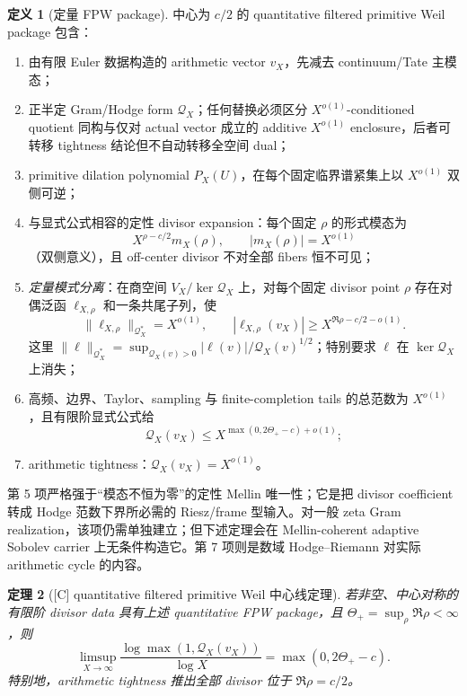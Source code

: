 \documentclass[UTF8,11pt,a4paper]{ctexart}
\newtheorem{theorem}{定理}[section]
\theoremstyle{definition}
\newtheorem{definition}[theorem]{定义}
\theoremstyle{remark}
\newcommand{\1}{\mathbf 1}
\newcommand{\cQ}{\mathcal Q}
\newcommand{\statusC}{\textnormal{[C]}}
\begin{document}
\begin{definition}[定量 FPW package]
中心为 $c/2$ 的 quantitative filtered primitive Weil package 包含：
\begin{enumerate}
  \item 由有限 Euler 数据构造的 arithmetic vector $v_X$，先减去 continuum/Tate 主模态；
  \item 正半定 Gram/Hodge form $\cQ_X$；任何替换必须区分 $X^{o(1)}$-conditioned quotient 同构与仅对 actual vector 成立的 additive $X^{o(1)}$ enclosure，后者可转移 tightness 结论但不自动转移全空间 dual；
  \item primitive dilation polynomial $P_X(U)$，在每个固定临界谱紧集上以 $X^{o(1)}$ 双侧可逆；
  \item 与显式公式相容的定性 divisor expansion：每个固定 $\rho$ 的形式模态为
  \[
    X^{\rho-c/2}m_X(\rho),\qquad |m_X(\rho)|=X^{o(1)}
  \]
  （双侧意义），且 off-center divisor 不对全部 fibers 恒不可见；
  \item \emph{定量模式分离}：在商空间 $V_X/\ker\cQ_X$ 上，对每个固定 divisor point $\rho$ 存在对偶泛函 $\ell_{X,\rho}$ 和一条共尾子列，使
  \[
   \|\ell_{X,\rho}\|_{\cQ_X^*}=X^{o(1)},\qquad
   |\ell_{X,\rho}(v_X)|
      \geq X^{\Re\rho-c/2-o(1)}.
  \]
  这里
  $\|\ell\|_{\cQ_X^*}=\sup_{\cQ_X(v)>0}|\ell(v)|/\cQ_X(v)^{1/2}$；特别要求 $\ell$ 在 $\ker\cQ_X$ 上消失；
  \item 高频、边界、Taylor、sampling 与 finite-completion tails 的总范数为 $X^{o(1)}$，且有限阶显式公式给
  \[
    \cQ_X(v_X)\leq X^{\max(0,2\Theta_+-c)+o(1)};
  \]
  \item arithmetic tightness：$\cQ_X(v_X)=X^{o(1)}$。
\end{enumerate}
第 5 项严格强于“模态不恒为零”的定性 Mellin 唯一性；它是把 divisor coefficient 转成 Hodge 范数下界所必需的 Riesz/frame 型输入。对一般 zeta Gram realization，该项仍需单独建立；但下述定理会在 Mellin-coherent adaptive Sobolev carrier 上无条件构造它。第 7 项则是数域 Hodge--Riemann 对实际 arithmetic cycle 的内容。
\end{definition}

\begin{theorem}[\statusC{} quantitative filtered primitive Weil 中心线定理]\label{thm:fpw}
若非空、中心对称的有限阶 divisor data 具有上述 quantitative FPW package，且
$\Theta_+=\sup_\rho\Re\rho<\infty$，则
\[
  \limsup_{X\to\infty}
  \frac{\log\max(1,\cQ_X(v_X))}{\log X}
  =\max(0,2\Theta_+-c).
\]
特别地，arithmetic tightness 推出全部 divisor 位于 $\Re\rho=c/2$。
\end{theorem}
\end{document}
